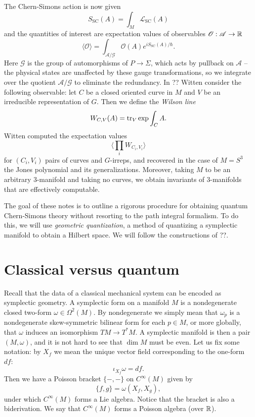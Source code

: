 \documentclass{amsart}
\begin{document}
The Chern-Simons action is now given
\begin{equation*}
    S_\text{SC}(A) = \int_M \mathscr{L}_\text{SC}(A)
\end{equation*}
and the quantities of interest are expectation values of observables $\mathscr{O}:\mathscr{A}\to\mathbb{R}$
\begin{equation*}
    \langle\mathscr{O}\rangle = \int_{\mathscr{A}/\mathscr{G}} \mathscr{O}(A) e^{iS_\text{SC}(A)/\hbar}.
\end{equation*}
Here $\mathscr{G}$ is the group of automorphisms of $P\to\Sigma$, which acts by pullback on
$\mathscr{A}$ -- the physical states are unaffected by these gauge transformations, so we integrate
over the quotient $\mathscr{A}/\mathscr{G}$ to eliminate the redundancy.
In {\color{red}??} Witten consider the following observable: let $C$ be a closed oriented curve
in $M$ and $V$ be an irreducible representation of $G$. Then we define the \textit{Wilson line}
\begin{equation*}
    W_{C,V}(A) = \operatorname{tr}_V \exp\int_C A.
\end{equation*}
Witten computed the expectation values
\begin{equation*}
    \langle \prod_i W_{C_i,V_i}\rangle
\end{equation*}
for $(C_i,V_i)$ pairs of curves and $G$-irreps, and recovered in the case of $M=S^3$ the Jones
polynomial and its generalizations. Moreover, taking $M$ to be an arbitrary 3-manifold and taking
no curves, we obtain invariants of 3-manifolds that are effectively computable.

The goal of these notes is to outline a rigorous procedure for obtaining quantum Chern-Simons theory
without resorting to the path integral formalism. To do this, we will use \textit{geometric quantization},
a method of quantizing a symplectic manifold to obtain a Hilbert space. We will follow the constructions
of {\color{red}??}.

\section{Classical versus quantum}
Recall that the data of a classical mechanical system can be encoded as symplectic geometry.
A symplectic form on a manifold $M$ is a nondegenerate closed two-form $\omega\in\Omega^2(M)$. 
By nondegenerate we simply mean that $\omega_p$ is a nondegenerate skew-symmetric bilinear form
for each $p\in M$, or more globally, that $\omega$ induces an isomorphism $TM\to T^*M$.
A symplectic manifold is then a pair $(M,\omega)$, and it is not hard to see that $\dim M$ must be even.
Let us fix some notation: by $X_f$ we mean the unique vector field corresponding to the one-form $df$:
\begin{equation*}
    \iota_{X_f}\omega = df.
\end{equation*}
Then we have a Poisson bracket $\{-,-\}$ on $C^\infty(M)$ given by
\begin{equation*}
    \{f, g\} = \omega(X_f, X_g),
\end{equation*}
under which $C^\infty(M)$ forms a Lie algebra. Notice that the bracket is also a biderivation. We say that
$C^\infty(M)$ forms a Poisson algebra (over $\mathbb{R}$).
\end{document}
